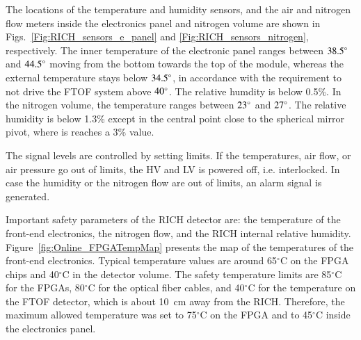 \documentclass[5p,times,twocolumn]{elsarticle}
\begin{document}
The locations of the temperature and humidity sensors, and the air and nitrogen flow meters inside the electronics
panel and nitrogen volume are shown in Figs.~\ref{Fig:RICH_sensors_e_panel} and \ref{Fig:RICH_sensors_nitrogen},
respectively. The inner temperature of the electronic panel ranges between $\rm 38.5^\circ$ and $\rm 44.5^\circ$
moving from the bottom towards the top of the module, whereas the external temperature stays below $\rm 34.5^\circ$,
in accordance with the requirement to not drive the FTOF system above $\rm 40^\circ$. The relative humdity is below
0.5\%. In the nitrogen volume, the temperature ranges between $\rm 23^\circ$ and $\rm 27^\circ$. The relative
humidity is below 1.3\% except in the central point close to the spherical mirror pivot, where is reaches a 3\% value.

The signal levels are controlled by setting limits.  If the temperatures, air flow, or air pressure go out of limits, the
HV and LV is powered off, i.e. interlocked. In case the humidity or the nitrogen flow are out of limits, an alarm signal
is generated.

Important safety parameters of the RICH detector are: the temperature of the front-end electronics, the nitrogen
flow, and the RICH internal relative humidity. Figure~\ref{fig:Online_FPGATempMap} presents the map of the
temperatures of the front-end electronics.
Typical temperature values are around 65$^\circ$C on the FPGA chips and 40$^\circ$C in the detector volume.
The safety temperature limits are 85$^\circ$C for the FPGAs, 80$^\circ$C for the optical fiber cables, and 40$^\circ$C
for the temperature on the FTOF detector, which is about 10~cm away from the RICH. Therefore, the maximum
allowed temperature was set to 75$^\circ$C on the FPGA and to 45$^\circ$C inside the electronics panel.

\end{document}
